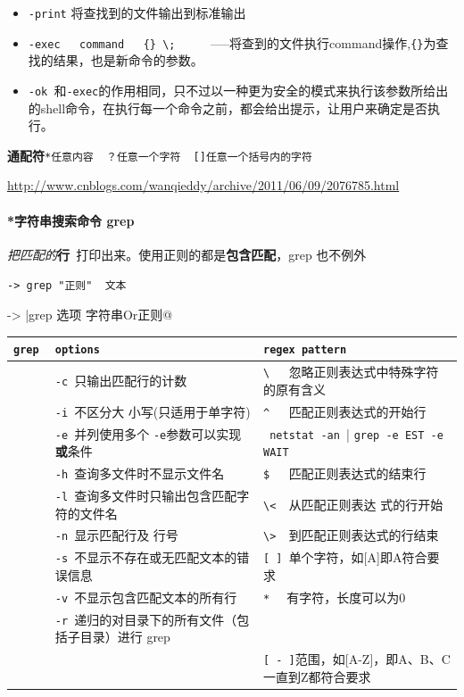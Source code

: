 \documentclass[UTF8,a4paper,12pt]{ctexbook}
\begin{document}
			\begin{itemize}
				\item  \verb|-print| 将查找到的文件输出到标准输出
				\item  \verb|-exec   command   {} \;|      —–将查到的文件执行command操作,\verb|{}|为查找的结果，也是新命令的参数。
				\item  \verb|-ok |和\verb|-exec|的作用相同，只不过以一种更为安全的模式来执行该参数所给出的shell命令，在执行每一个命令之前，都会给出提示，让用户来确定是否执行。
			\end{itemize}
			
			\textbf{通配符}\verb|*任意内容  ？任意一个字符  []任意一个括号内的字符|
		
			\hspace{1cm} \url{http://www.cnblogs.com/wanqieddy/archive/2011/06/09/2076785.html}
			
		\paragraph{*字符串搜索命令 grep}\textit{把匹配的}\textbf{行}\verb| |打印出来。使用正则的都是\textbf{包含匹配}，grep 也不例外
		
			\verb|-> grep "正则"  文本|
			
			\verb@-> |grep 选项  字符串Or正则@
			\begin{table}[H]
				\centering
				\begin{tabular}{l|m{7cm}|m{8cm}}
					\hline
					\verb|grep |   	   & \verb|options| & \verb|regex pattern|\\
					\hline
					\verb| |   	   & \verb|-c |只输出匹配行的计数 & \verb|\   |忽略正则表达式中特殊字符的原有含义\\
					\verb| |   	   & \verb|-i |不区分大 小写(只适用于单字符) & \verb|^   |匹配正则表达式的开始行\\
					\verb| |       & \verb|-e |并列使用多个 \verb|-e|参数可以实现\textbf{或}条件					& \verb| netstat -an || \verb|grep -e EST -e WAIT|\\
					\verb| |   	   & \verb|-h |查询多文件时不显示文件名 & \verb|$   |匹配正则表达式的结束行\\
					\verb| |   	   & \verb|-l |查询多文件时只输出包含匹配字符的文件名 & \verb|\<  |从匹配正则表达 式的行开始\\
					\verb| |   	   & \verb|-n |显示匹配行及 行号& \verb|\>  |到匹配正则表达式的行结束\\
					\verb| |   	   & \verb|-s |不显示不存在或无匹配文本的错误信息 & \verb|[ ] |单个字符，如[A]即A符合要求\\
					\verb| |   	   & \verb|-v |不显示包含匹配文本的所有行 & \verb|*  | 有字符，长度可以为0\\
					\verb| |   	   & \verb|-r |递归的对目录下的所有文件（包括子目录）进行 grep & \\
					\verb| |   	   & & \verb|[ - ]|范围，如[A-Z]，即A、B、C一直到Z都符合要求\\
					\hline
				\end{tabular}
			\end{table}		
			
\end{document}
